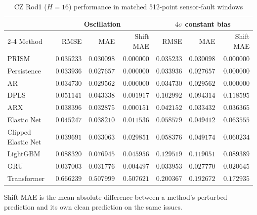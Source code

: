 \begin{table}[!t]
\centering
\caption{CZ Rod1 ($H=16$) performance in matched 512-point sensor-fault windows}
\label{tab:fault-rod1}
\small
\begin{tabular}{lrrrrrr}
\hline
 & \multicolumn{3}{c}{Oscillation} & \multicolumn{3}{c}{$4\sigma$ constant bias} \\
\cline{2-4}\cline{5-7}
Method & RMSE & MAE & Shift MAE & RMSE & MAE & Shift MAE \\
\hline
PRISM & \(0.035233\) & \(0.030098\) & \(0.000000\) & \(0.035233\) & \(0.030098\) & \(0.000000\) \\
Persistence & \(0.033936\) & \(0.027657\) & \(0.000000\) & \(0.033936\) & \(0.027657\) & \(0.000000\) \\
AR & \(0.034730\) & \(0.029562\) & \(0.000000\) & \(0.034730\) & \(0.029562\) & \(0.000000\) \\
DPLS & \(0.051141\) & \(0.043338\) & \(0.001917\) & \(0.102992\) & \(0.094314\) & \(0.118595\) \\
ARX & \(0.038396\) & \(0.032875\) & \(0.000151\) & \(0.042152\) & \(0.033432\) & \(0.036365\) \\
Elastic Net & \(0.045247\) & \(0.038210\) & \(0.011536\) & \(0.058579\) & \(0.049412\) & \(0.063555\) \\
Clipped Elastic Net & \(0.039691\) & \(0.033063\) & \(0.029851\) & \(0.058376\) & \(0.049174\) & \(0.060234\) \\
LightGBM & \(0.088320\) & \(0.076945\) & \(0.045956\) & \(0.129519\) & \(0.119051\) & \(0.089389\) \\
GRU & \(0.037003\) & \(0.031776\) & \(0.004497\) & \(0.033953\) & \(0.027770\) & \(0.020645\) \\
Transformer & \(0.666239\) & \(0.507999\) & \(0.507621\) & \(0.200367\) & \(0.192672\) & \(0.172935\) \\
\hline
\end{tabular}
\par\smallskip
\parbox{0.96\textwidth}{\footnotesize Shift MAE is the mean absolute difference between a method's perturbed prediction and its own clean prediction on the same issues.}
\end{table}


